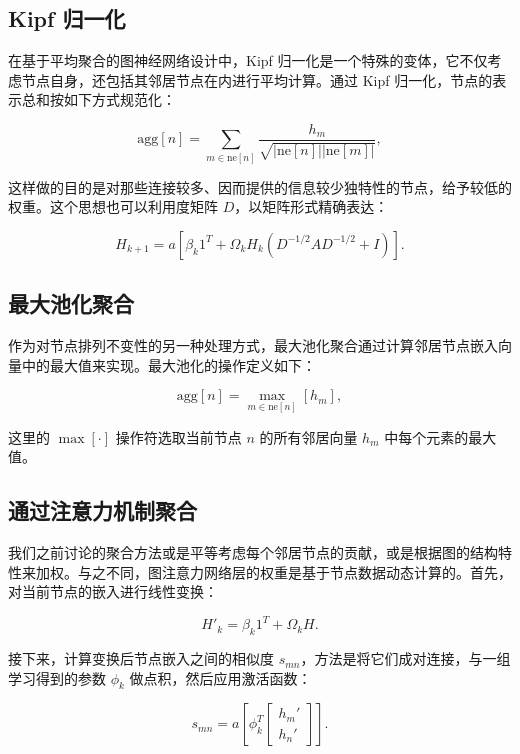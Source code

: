 \subsection{Kipf 归一化}
在基于平均聚合的图神经网络设计中，Kipf 归一化是一个特殊的变体，它不仅考虑节点自身，还包括其邻居节点在内进行平均计算。通过 Kipf 归一化，节点的表示总和按如下方式规范化：

\begin{equation}
\text{agg}[n] = \sum_{m \in \text{ne}[n]} \frac{h_m}{\sqrt{|\text{ne}[n]||\text{ne}[m]|}}, 
\end{equation}

这样做的目的是对那些连接较多、因而提供的信息较少独特性的节点，给予较低的权重。这个思想也可以利用度矩阵 \(D\)，以矩阵形式精确表达：

\begin{equation}
H_{k+1} = a \left[ \beta_k 1^T + \Omega_k H_k (D^{-1/2} A D^{-1/2} + I) \right]. 
\end{equation}

\subsection{最大池化聚合}
作为对节点排列不变性的另一种处理方式，最大池化聚合通过计算邻居节点嵌入向量中的最大值来实现。最大池化的操作定义如下：

\begin{equation}
\text{agg}[n] = \max_{m \in \text{ne}[n]} \left[ h_m \right], 
\end{equation}

这里的 \(\max[\cdot]\) 操作符选取当前节点 \(n\) 的所有邻居向量 \(h_m\) 中每个元素的最大值。

\subsection{通过注意力机制聚合}

我们之前讨论的聚合方法或是平等考虑每个邻居节点的贡献，或是根据图的结构特性来加权。与之不同，图注意力网络层的权重是基于节点数据动态计算的。首先，对当前节点的嵌入进行线性变换：

\begin{equation}
H'_k = \beta_k 1^T + \Omega_k H. 
\end{equation}

接下来，计算变换后节点嵌入之间的相似度 \(s_{mn}\)，方法是将它们成对连接，与一组学习得到的参数 \(\phi_k\) 做点积，然后应用激活函数：

\begin{equation}
s_{mn} = a \left[ \phi_k^T \left[ \begin{array}{c}
h_m' \\
h_n'
\end{array} \right] \right]. 
\end{equation}

